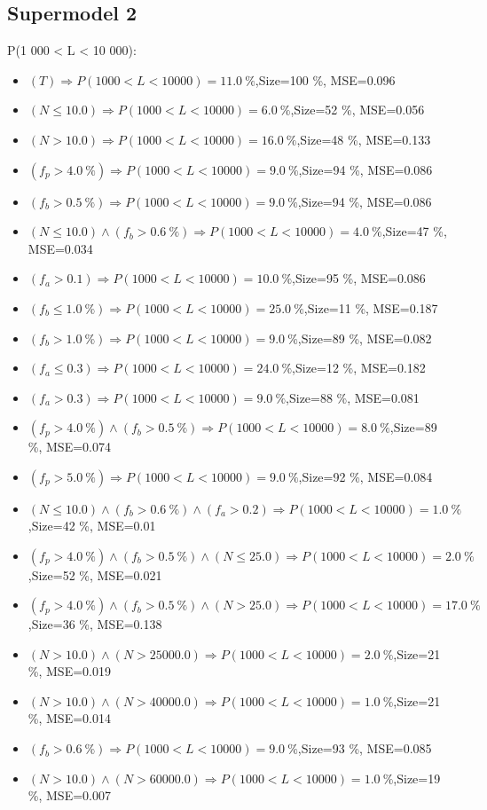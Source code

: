 \documentclass[numbered]{CSL}
\begin{document}
\subsection{Supermodel 2}
P(1 000 < L < 10 000):
\begin{itemize}
\item $(T) \Rightarrow P(1 000 < L < 10 000) = 11.0~\%$,\hfill Size=100 \%, MSE=0.096
\item $(N \leq 10.0) \Rightarrow P(1 000 < L < 10 000) = 6.0~\%$,\hfill Size=52 \%, MSE=0.056
\item $(N > 10.0) \Rightarrow P(1 000 < L < 10 000) = 16.0~\%$,\hfill Size=48 \%, MSE=0.133
\item $(f_p > 4.0~\%) \Rightarrow P(1 000 < L < 10 000) = 9.0~\%$,\hfill Size=94 \%, MSE=0.086
\item $(f_b > 0.5~\%) \Rightarrow P(1 000 < L < 10 000) = 9.0~\%$,\hfill Size=94 \%, MSE=0.086
\item $(N \leq 10.0) \land (f_b > 0.6~\%) \Rightarrow P(1 000 < L < 10 000) = 4.0~\%$,\hfill Size=47 \%, MSE=0.034
\item $(f_a > 0.1) \Rightarrow P(1 000 < L < 10 000) = 10.0~\%$,\hfill Size=95 \%, MSE=0.086
\item $(f_b \leq 1.0~\%) \Rightarrow P(1 000 < L < 10 000) = 25.0~\%$,\hfill Size=11 \%, MSE=0.187
\item $(f_b > 1.0~\%) \Rightarrow P(1 000 < L < 10 000) = 9.0~\%$,\hfill Size=89 \%, MSE=0.082
\item $(f_a \leq 0.3) \Rightarrow P(1 000 < L < 10 000) = 24.0~\%$,\hfill Size=12 \%, MSE=0.182
\item $(f_a > 0.3) \Rightarrow P(1 000 < L < 10 000) = 9.0~\%$,\hfill Size=88 \%, MSE=0.081
\item $(f_p > 4.0~\%) \land (f_b > 0.5~\%) \Rightarrow P(1 000 < L < 10 000) = 8.0~\%$,\hfill Size=89 \%, MSE=0.074
\item $(f_p > 5.0~\%) \Rightarrow P(1 000 < L < 10 000) = 9.0~\%$,\hfill Size=92 \%, MSE=0.084
\item $(N \leq 10.0) \land (f_b > 0.6~\%) \land (f_a > 0.2) \Rightarrow P(1 000 < L < 10 000) = 1.0~\%$,\hfill Size=42 \%, MSE=0.01
\item $(f_p > 4.0~\%) \land (f_b > 0.5~\%) \land (N \leq 25.0) \Rightarrow P(1 000 < L < 10 000) = 2.0~\%$,\hfill Size=52 \%, MSE=0.021
\item $(f_p > 4.0~\%) \land (f_b > 0.5~\%) \land (N > 25.0) \Rightarrow P(1 000 < L < 10 000) = 17.0~\%$,\hfill Size=36 \%, MSE=0.138
\item $(N > 10.0) \land (N > 25000.0) \Rightarrow P(1 000 < L < 10 000) = 2.0~\%$,\hfill Size=21 \%, MSE=0.019
\item $(N > 10.0) \land (N > 40000.0) \Rightarrow P(1 000 < L < 10 000) = 1.0~\%$,\hfill Size=21 \%, MSE=0.014
\item $(f_b > 0.6~\%) \Rightarrow P(1 000 < L < 10 000) = 9.0~\%$,\hfill Size=93 \%, MSE=0.085
\item $(N > 10.0) \land (N > 60000.0) \Rightarrow P(1 000 < L < 10 000) = 1.0~\%$,\hfill Size=19 \%, MSE=0.007
\end{itemize}
\end{document}
